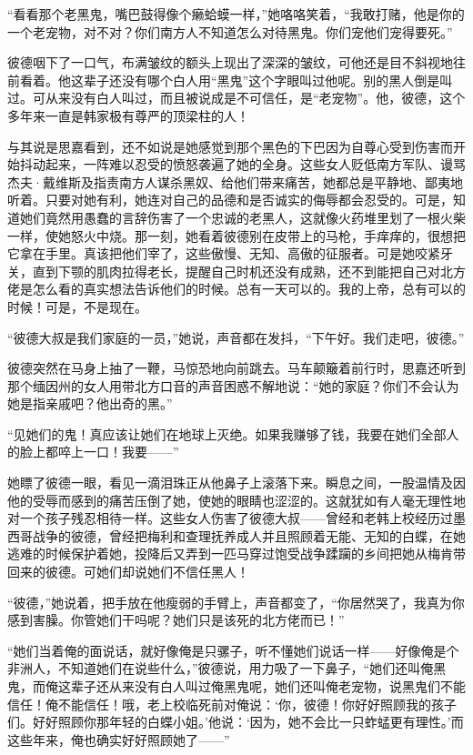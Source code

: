 \par “看看那个老黑鬼，嘴巴鼓得像个癞蛤蟆一样，”她咯咯笑着，“我敢打赌，他是你的一个老宠物，对不对？你们南方人不知道怎么对待黑鬼。你们宠他们宠得要死。”
\par 彼德咽下了一口气，布满皱纹的额头上现出了深深的皱纹，可他还是目不斜视地往前看着。他这辈子还没有哪个白人用“黑鬼”这个字眼叫过他呢。别的黑人倒是叫过。可从来没有白人叫过，而且被说成是不可信任，是“老宠物”。他，彼德，这个多年来一直是韩家极有尊严的顶梁柱的人！
\par 与其说是思嘉看到，还不如说是她感觉到那个黑色的下巴因为自尊心受到伤害而开始抖动起来，一阵难以忍受的愤怒袭遍了她的全身。这些女人贬低南方军队、谩骂杰夫·戴维斯及指责南方人谋杀黑奴、给他们带来痛苦，她都总是平静地、鄙夷地听着。只要对她有利，她连对自己的品德和是否诚实的侮辱都会忍受的。可是，知道她们竟然用愚蠢的言辞伤害了一个忠诚的老黑人，这就像火药堆里划了一根火柴一样，使她怒火中烧。那一刻，她看着彼德别在皮带上的马枪，手痒痒的，很想把它拿在手里。真该把他们宰了，这些傲慢、无知、高傲的征服者。可是她咬紧牙关，直到下颚的肌肉拉得老长，提醒自己时机还没有成熟，还不到能把自己对北方佬是怎么看的真实想法告诉他们的时候。总有一天可以的。我的上帝，总有可以的时候！可是，不是现在。
\par “彼德大叔是我们家庭的一员，”她说，声音都在发抖，“下午好。我们走吧，彼德。”
\par 彼德突然在马身上抽了一鞭，马惊恐地向前跳去。马车颠簸着前行时，思嘉还听到那个缅因州的女人用带北方口音的声音困惑不解地说：“她的家庭？你们不会认为她是指亲戚吧？他出奇的黑。”
\par “见她们的鬼！真应该让她们在地球上灭绝。如果我赚够了钱，我要在她们全部人的脸上都啐上一口！我要——”
\par 她瞟了彼德一眼，看见一滴泪珠正从他鼻子上滚落下来。瞬息之间，一股温情及因他的受辱而感到的痛苦压倒了她，使她的眼睛也涩涩的。这就犹如有人毫无理性地对一个孩子残忍相待一样。这些女人伤害了彼德大叔——曾经和老韩上校经历过墨西哥战争的彼德，曾经把梅利和查理抚养成人并且照顾着无能、无知的白蝶，在她逃难的时候保护着她，投降后又弄到一匹马穿过饱受战争蹂躏的乡间把她从梅肯带回来的彼德。可她们却说她们不信任黑人！
\par “彼德，”她说着，把手放在他瘦弱的手臂上，声音都变了，“你居然哭了，我真为你感到害臊。你管她们干吗呢？她们只是该死的北方佬而已！”
\par “她们当着俺的面说话，就好像俺是只骡子，听不懂她们说话一样——好像俺是个非洲人，不知道她们在说些什么，”彼德说，用力吸了一下鼻子，“她们还叫俺黑鬼，而俺这辈子还从来没有白人叫过俺黑鬼呢，她们还叫俺老宠物，说黑鬼们不能信任！俺不能信任！哦，老上校临死前对俺说：‘你，彼德！你好好照顾我的孩子们。好好照顾你那年轻的白蝶小姐。’他说：‘因为，她不会比一只蚱蜢更有理性。’而这些年来，俺也确实好好照顾她了——”
